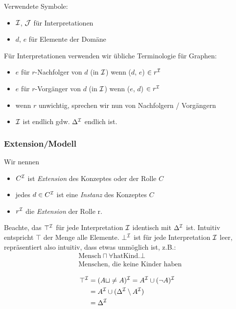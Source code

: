 Verwendete Symbole:

\begin{itemize}
  \item $\mathcal{I}$, $\mathcal{J}$ für Interpretationen
  \item $d$, $e$ für Elemente der Domäne
\end{itemize}

Für Interpretationen verwenden wir übliche Terminologie für Graphen:

\begin{itemize}
  \item $e$ für $r$-Nachfolger von $d$ (in $\mathcal{I}$) wenn ($d$, $e$) $\in r^{\mathcal{I}}$
  \item $e$ für $r$-Vorgänger von $d$ (in $\mathcal{I}$) wenn ($e$, $d$) $\in r^{\mathcal{I}}$
  \item wenn $r$ unwichtig, sprechen wir nun von Nachfolgern / Vorgängern
  \item $\mathcal{I}$ ist endlich gdw. $\Delta^{\mathcal{I}}$ endlich ist.
\end{itemize}

\subsubsection{Extension/Modell}
\label{sec:exetension}

Wir nennen
\begin{itemize}
\item
  $C^{\mathcal{I}}$ ist \emph{Extension} des Konzeptes oder der Rolle $C$
\item
    jedes $d \in C^{\mathcal{I}}$ ist eine \emph{Instanz} des Konzeptes $C$
\item $r^{\mathcal{I}}$ die \emph{Extension} der Rolle r.
\end{itemize}

Beachte, das $\top^{\mathcal{I}}$ für jede Interpretation $\mathcal{I}$ identisch mit
$\Delta^{\mathcal{I}}$ ist. Intuitiv entspricht $\top$ der Menge alle Elemente.
$\bot^{\mathcal{I}}$ ist für jede Interpretation $\mathcal{I}$ leer, repräsentiert also
intuitiv, dass etwas unmöglich ist, z.B.:
\begin{align*}
    &\text{Mensch} \sqcap \forall \text{hatKind}.\bot\\
    &\text{Menschen, die keine Kinder haben}
\end{align*}

\begin{tafel}[Beweis $\top^\MI = \Delta^\MI$]
    \begin{align*}
        \top^{\mathcal{I}} &= (A \sqcup \neq A)^{\mathcal{I}} = A^{\mathcal{I}} \cup (\neg A)^{\mathcal{I}}\\
                 &= A^{\mathcal{I}} \cup (\Delta^{\mathcal{I}} \setminus A^{\mathcal{I}})\\
                 &= \Delta^{\mathcal{I}}
    \end{align*}
\end{tafel}

